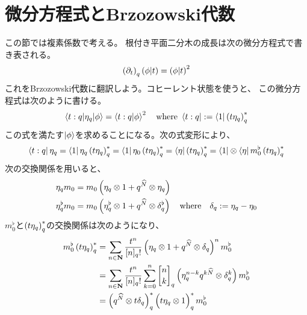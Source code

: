 {\setlength\arraycolsep{2pt}
%
\section{微分方程式とBrzozowski代数}\label{s1:微分方程式とBrzozowski代数} %
	この節では複素係数で考える。
	根付き平面二分木の成長は次の微分方程式で書き表される。
	\begin{equation*}\begin{split}
		\mathinner{\left({\partial_t}\right)}_q\mathinner{\left({\phi|t}\right)} = \mathinner{\left({\phi|t}\right)}^2
	\end{split}\end{equation*}
	これをBrzozowski代数に翻訳しよう。コヒーレント状態を使うと、
	この微分方程式は次のように書ける。
	\begin{equation*}\begin{split}
		\mathinner{\langle{t:q|\eta_q|\phi}\rangle} = \mathinner{\langle{t:q|\phi}\rangle}^2 \quad\text{where }
		\mathinner{\langle{t:q}|} := \mathinner{\langle{1}|}\mathinner{\left({t\eta_q}\right)}_q^*
	\end{split}\end{equation*}
	この式を満たす$\mathinner{|{\phi}\rangle}$を求めることになる。次の式変形により、
	\begin{equation*}\begin{split}
		\mathinner{\langle{t:q}|}\eta_q = \mathinner{\langle{1}|}\eta_q\mathinner{\left({t\eta_q}\right)}_q^*
		= \mathinner{\langle{1}|}\eta_0\mathinner{\left({t\eta_q}\right)}_q^* = \mathinner{\langle{\eta}|}\mathinner{\left({t\eta_q}\right)}_q^*
		= \mathinner{\langle{1}|}\otimes\mathinner{\langle{\eta}|}m_0^\flat\mathinner{\left({t\eta_q}\right)}_q^*
	\end{split}\end{equation*}
	次の交換関係を用いると、
	\begin{equation*}\begin{split}
		\eta_qm_0 &= m_0\mathinner{\left({\eta_q\otimes1 + q^{\widehat{N}}\otimes\eta_q}\right)} \\
		\eta_q^\flat m_0 &= m_0\mathinner{\left({\eta_q^\flat\otimes1 
			+ q^{\widehat{N}}\otimes\delta_q^\flat}\right)} \quad\text{where}\quad 
			\delta_q := \eta_q - \eta_0
	\end{split}\end{equation*}
	$m_0^\flat$と$\mathinner{\left({t\eta_q}\right)}_q^*$の交換関係は次のようになり、
	\begin{equation*}\begin{split}
		m_0^\flat\plr{t\eta_q}_q^*
		&= \sum_{n\in\sizen}\frac{t^n}{[n]_q!}\plr{\eta_q\otimes1 
			+ q^{\Nhat}\otimes\delta_q}^n m_0^\flat \\
		&= \sum_{n\in\sizen}\frac{t^n}{[n]_q!}\sum_{k=0}^n\qbinom{n}{k}_q
			\plr{\eta_q^{n-k}q^{k\Nhat}\otimes\delta_q^k}m_0^\flat \\
		&= \plr{q^{\Nhat}\otimes t\delta_q}_q^*\ggplr{t\eta_q\otimes1}_q^*m_0^\flat

\end{split}
\end{equation*}}
